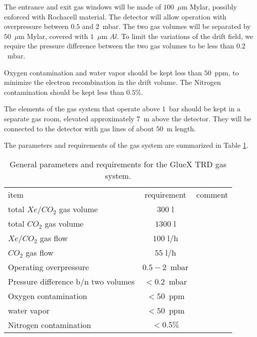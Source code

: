 \documentclass[%
preprint,
nofootinbib,
 amsmath,amssymb,
 aps,
floatfix,
]{revtex4-1}
\begin{document}
The entrance and exit gas windows will be made of $100$~$\mu$m Mylar, possibly enforced with Rochacell
material.
The detector will allow operation with overpressure between $0.5$ and $2$~mbar.
The two gas volumes will be separated by $50$~$\mu$m Mylar, covered with $1$~$\mu$m $Al$.
To limit the variations of the drift field, we require the pressure difference between the two gas
volumes to be less than $0.2$~mbar. 

Oxygen contamination and water vapor should be kept less than $50$~ppm, 
to minimize the electron recombination 
in the drift volume. The Nitrogen contamination should be kept less than $0.5\%$.

The elements of the gas system that operate above $1$~bar should be kept in a separate gas room,
elevated approximately $7$~m above the detector. They will be connected to the detector with
gas lines of about $50$~m length.

The parameters and requirements of the gas system are summarized in Table \ref{tab:param}.

\begin{table}[hp]
\begin{ruledtabular}
\begin{tabular}{lcc}
\textrm{item}&
\textrm{requirement}&
\textrm{comment}\\
\colrule
total $Xe/CO_2$  gas volume & $300$ l &\\
total $CO_2$ gas volume & $1300$ l &\\
$Xe/CO_2$  gas flow & $100$ l/h &\\
$CO_2$ gas flow & $55$ l/h &\\
Operating overpressure & $0.5-2$~mbar &\\
Pressure difference b/n two volumes & $<0.2$~mbar &\\
Oxygen contamination & $<50$~ppm &\\
water vapor & $<50$~ppm &\\
Nitrogen contamination & $<0.5\%$ &\\
\end{tabular}
\end{ruledtabular}
\caption{
General parameters and requirements for the GlueX TRD gas system.
\label{tab:param}
}
\end{table}


\end{document}

